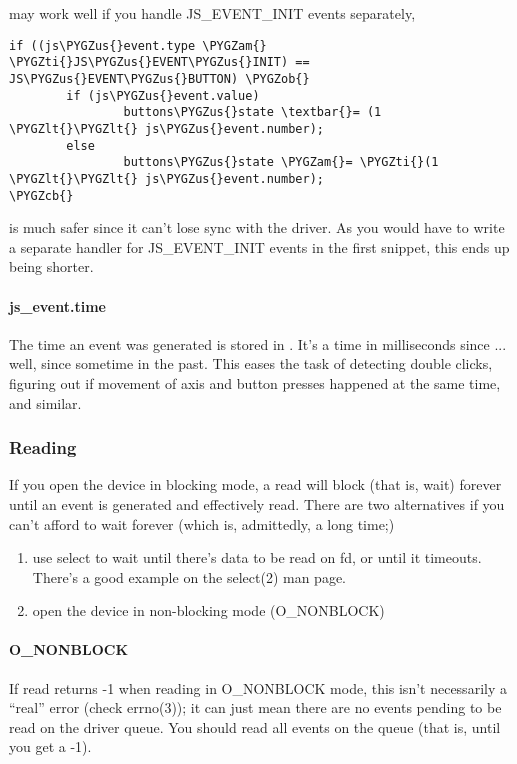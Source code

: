 \documentclass[a4paper,8pt,english]{sphinxmanual}
\def\PYGZus{\char`\_}
\def\PYGZob{\char`\{}
\def\PYGZcb{\char`\}}
\def\PYGZam{\char`\&}
\def\PYGZlt{\char`\<}
\def\PYGZti{\char`\~}
\begin{document}
may work well if you handle JS\_EVENT\_INIT events separately,

\begin{Verbatim}[commandchars=\\\{\}]
if ((js\PYGZus{}event.type \PYGZam{} \PYGZti{}JS\PYGZus{}EVENT\PYGZus{}INIT) == JS\PYGZus{}EVENT\PYGZus{}BUTTON) \PYGZob{}
        if (js\PYGZus{}event.value)
                buttons\PYGZus{}state \textbar{}= (1 \PYGZlt{}\PYGZlt{} js\PYGZus{}event.number);
        else
                buttons\PYGZus{}state \PYGZam{}= \PYGZti{}(1 \PYGZlt{}\PYGZlt{} js\PYGZus{}event.number);
\PYGZcb{}
\end{Verbatim}

is much safer since it can't lose sync with the driver. As you would
have to write a separate handler for JS\_EVENT\_INIT events in the first
snippet, this ends up being shorter.


\paragraph{js\_event.time}
\label{input/joydev/joystick-api:js-event-time}
The time an event was generated is stored in . It's a time
in milliseconds since ... well, since sometime in the past.  This eases the
task of detecting double clicks, figuring out if movement of axis and button
presses happened at the same time, and similar.


\subsubsection{Reading}
\label{input/joydev/joystick-api:reading}
If you open the device in blocking mode, a read will block (that is,
wait) forever until an event is generated and effectively read. There
are two alternatives if you can't afford to wait forever (which is,
admittedly, a long time;)
\begin{enumerate}
\item {} 
use select to wait until there's data to be read on fd, or
until it timeouts. There's a good example on the select(2)
man page.

\item {} 
open the device in non-blocking mode (O\_NONBLOCK)

\end{enumerate}


\paragraph{O\_NONBLOCK}
\label{input/joydev/joystick-api:o-nonblock}
If read returns -1 when reading in O\_NONBLOCK mode, this isn't
necessarily a ``real'' error (check errno(3)); it can just mean there
are no events pending to be read on the driver queue. You should read
all events on the queue (that is, until you get a -1).
\end{document}
